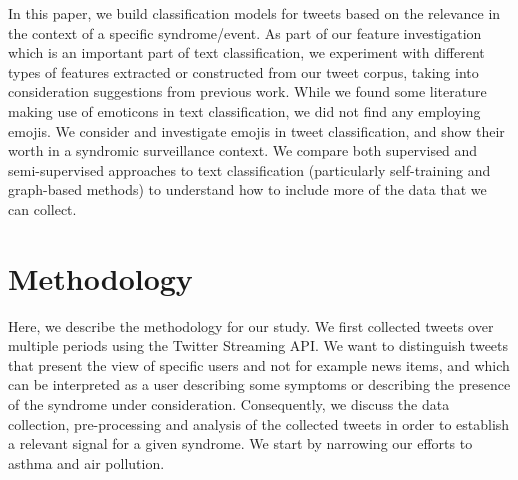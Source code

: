 \documentclass[10pt,letterpaper]{article}
\begin{document}
In this paper, we build classification models for tweets based on the relevance in the context of a specific syndrome/event.   As part of our feature investigation which is an important part of text classification, we experiment with different types of features extracted or constructed from our tweet corpus, taking into consideration suggestions from previous work.  While we found some literature making use of emoticons in text classification, we did not find any employing emojis. We consider and investigate emojis in tweet classification, and show their worth in a syndromic surveillance context. We compare both supervised and semi-supervised approaches to text classification (particularly self-training and graph-based methods) to understand how to include more of the data that we can collect.  

\section{Methodology}
\label{Methodology}
Here, we describe the methodology for our study. We first collected tweets over multiple periods  using the Twitter Streaming API.  We want to distinguish tweets that present the view of specific users and not for example news items, and which can be interpreted as a user describing some symptoms or describing the presence of the syndrome under consideration. Consequently, we discuss the data collection, pre-processing and analysis of the collected tweets in order to establish a relevant signal for a given  syndrome. We start by narrowing our efforts to asthma and air pollution.
\end{document}
